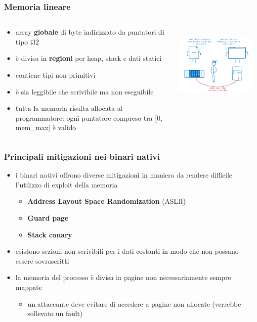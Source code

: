 \documentclass{beamer}
\begin{document}
\begin{frame}
  \frametitle{Memoria lineare}
  \begin{columns}
    \begin{column}{0.6\textwidth}
      \begin{itemize}
        \item array \textbf{globale} di byte indirizzato da puntatori di tipo i32
      \item è divisa in \textbf{regioni} per heap, stack e dati statici
        \item contiene tipi non primitivi 
        \item è sia leggibile che scrivibile ma non eseguibile 
        \item tutta la memoria risulta allocata al programmatore: ogni puntatore compreso tra [0, mem\_max] è valido 
      \end{itemize}
    \end{column}
    \begin{column}{0.4\textwidth}
      \centerline{\includegraphics[width=8cm,height=4cm,keepaspectratio]{images/memman.png}}
    \end{column}
  \end{columns}
\end{frame}

\begin{frame}
  \frametitle{Principali mitigazioni nei binari nativi}
  \begin{itemize}
    \item i binari nativi offrono diverse mitigazioni in maniera da rendere
      difficile l'utilizzo di exploit della memoria
      \begin{itemize}
        \item \textbf{Address Layout Space Randomization} (ASLR)      
        \item \textbf{Guard page}        
        \item \textbf{Stack canary} 
      \end{itemize}
    \item esistono sezioni non scrivibili per i dati costanti in modo che
      non possano essere sovrascritti
    \item la memoria del processo è divisa in pagine non necessariamente sempre
      mappate
      \begin{itemize}
        \item un attaccante deve evitare di accedere a pagine non allocate
          (verrebbe sollevato un fault)
      \end{itemize}
  \end{itemize}
\end{frame}
\end{document}

